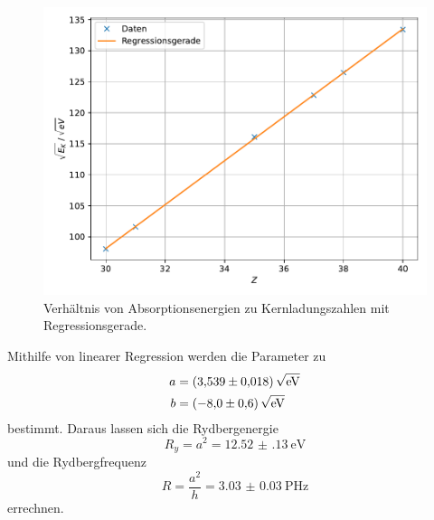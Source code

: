 \begin{figure}
    \centering
    \includegraphics[width=\textwidth]{build/plot_moseley.pdf}
    \caption{Verhältnis von Absorptionsenergien zu Kernladungszahlen mit Regressionsgerade.}
    \label{fig:moseley_regression}
\end{figure}

Mithilfe von linearer Regression werden die Parameter zu
\begin{align*}
    a &= \SI{3.539(18)}{\sqrt{\electronvolt}} \\
    b &= \SI{-8.0(6)}{\sqrt{\electronvolt}}
\end{align*}
bestimmt.
Daraus lassen sich die Rydbergenergie
\[ R_y = a^2 = \SI{12.52(13)}{\electronvolt} \]
und die Rydbergfrequenz
\[ R = \frac{a^2}{h} = \SI{3.03(3)}{\peta\hertz} \]
errechnen.
